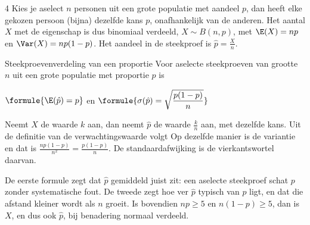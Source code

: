 \begin{alleenvoor}{4}
Kies je aselect $n$ personen uit een grote populatie met aandeel $p$, dan heeft elke gekozen persoon (bijna) dezelfde kans $p$, onafhankelijk van de anderen. Het aantal $X$ met de eigenschap is dus binomiaal verdeeld, $X \sim B(n, p)$, met $\E(X) = np$ en $\Var(X) = np(1 - p)$. Het aandeel in de steekproef is $\hat{p} = \frac{X}{n}$.

\begin{theorie}
\begin{stelling}{Steekproevenverdeling van een proportie}
Voor aselecte steekproeven van grootte $n$ uit een grote populatie met proportie $p$ is

\vspace{1mm}
\qquad $\formule{\E(\hat{p}) = p}$ \qquad en \qquad $\formule{\sigma(\hat{p}) = \sqrt{\dfrac{p(1 - p)}{n}}}$
\end{stelling}

\begin{bewijs}
Neemt $X$ de waarde $k$ aan, dan neemt $\hat{p}$ de waarde $\frac{k}{n}$ aan, met dezelfde kans. Uit de definitie van de verwachtingswaarde volgt
Op dezelfde manier is de variantie
en dat is $\frac{np(1 - p)}{n^2} = \frac{p(1 - p)}{n}$. De standaardafwijking is de vierkantswortel daarvan.
\end{bewijs}
\end{theorie}

De eerste formule zegt dat $\hat{p}$ gemiddeld juist zit: een aselecte steekproef schat $p$ zonder systematische fout. De tweede zegt hoe ver $\hat{p}$ typisch van $p$ ligt, en dat die afstand kleiner wordt als $n$ groeit. Is bovendien $np \geqslant 5$ en $n(1 - p) \geqslant 5$, dan is $X$, en dus ook $\hat{p}$, bij benadering normaal verdeeld.
\end{alleenvoor}


